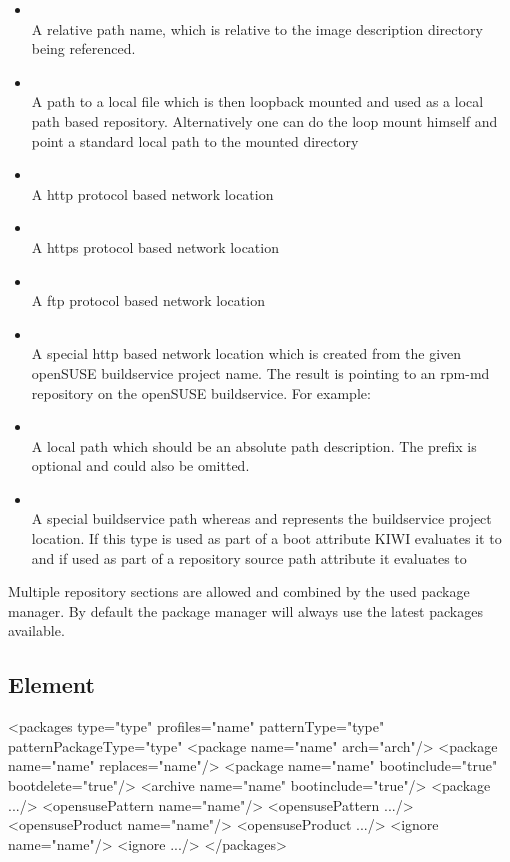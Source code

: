 \begin{itemize}
\item {}\\
      A relative path name, which is relative to the image
      description directory being referenced.
\item {}\\
      A path to a local  file which is then loopback mounted
      and used as a local path based repository. Alternatively one
      can do the loop mount himself and point a standard local path
      to the mounted directory
\item {}\\
      A http protocol based network location
\item {}\\
      A https protocol based network location
\item {}\\
      A ftp protocol based network location
\item {}\\
      A special http based network location which is created from
      the given openSUSE buildservice project name. The result is
      pointing to an rpm-md repository on the openSUSE buildservice.
      For example: %
\item {}\\
      A local path which should be an absolute path description.
      The  prefix is optional and could also be omitted.
\item {}\\
      A special buildservice path whereas  and 
      represents the buildservice project location. If this type is
      used as part of a boot attribute KIWI evaluates it to
       and if used as part of a repository
      source path attribute it evaluates to 
\end{itemize}

Multiple repository sections are allowed and combined by the
used package manager. By default the package manager will always use
the latest packages available.

\subsection{ Element}
\begin{xml}
<packages type="type" profiles="name" patternType="type" patternPackageType="type"
  <package name="name" arch="arch"/>
  <package name="name" replaces="name"/>
  <package name="name" bootinclude="true" bootdelete="true"/>
  <archive name="name" bootinclude="true"/>
  <package .../>
  <opensusePattern name="name"/>
  <opensusePattern .../>
  <opensuseProduct name="name"/>
  <opensuseProduct .../>
  <ignore name="name"/>
  <ignore .../>
</packages>
\end{xml}

